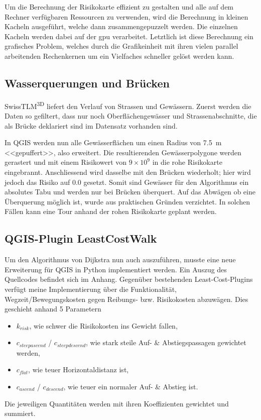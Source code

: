 Um die Berechnung der Risikokarte effizient zu gestalten und alle auf dem Rechner verfügbaren Ressourcen zu verwenden, wird die Berechnung in kleinen Kacheln ausgeführt, welche dann zusammengepuzzelt werden. Die einzelnen Kacheln werden dabei auf der \acrshort{gpu} verarbeitet. Letztlich ist diese Berechnung ein grafisches Problem, welches durch die Grafikeinheit mit ihren vielen parallel arbeitenden Rechenkernen um ein Vielfaches schneller gelöst werden kann.

\subsection{Wasserquerungen und Brücken}

SwissTLM\textsuperscript{3D} liefert den Verlauf von Strassen und Gewässern. Zuerst werden die Daten so gefiltert, dass nur noch Oberflächengewässer und Strassenabschnitte, die als Brücke deklariert sind im Datensatz vorhanden sind.

In QGIS werden nun alle Gewässerflächen um einen Radius von \qty{7.5}{m} <<gepuffert>>, also erweitert. Die resultierenden Gewässerpolygone werden gerastert und mit einem Risikowert von $9 \times 10^{9}$ in die rohe Risikokarte eingebrannt. Anschliessend wird dasselbe mit den Brücken wiederholt; hier wird jedoch das Risiko auf $0.0$ gesetzt. Somit sind Gewässer für den Algorithmus ein absolutes Tabu und werden nur bei Brücken überquert. Auf das Abwägen ob eine Überquerung möglich ist, wurde aus praktischen Gründen verzichtet. In solchen Fällen kann eine Tour anhand der rohen Risikokarte geplant werden.

\pagebreak
\subsection{QGIS-Plugin LeastCostWalk}

Um den Algorithmus von Dijkstra nun auch auszuführen, musste eine neue Erweiterung für QGIS in Python implementiert werden. Ein Auszug des Quellcodes befindet sich im Anhang. Gegenüber bestehenden Least-Cost-Plugins verfügt meine Implementierung über die Funktionalität, Wegzeit/Bewegungskosten gegen Reibungs- bzw. Risikokosten abzuwägen. Dies geschieht anhand 5 Parametern 

\begin{itemize}
  \item $k_{risk}$, wie schwer die Risikokosten ins Gewicht fallen,
  \item $c_{steepascend}$ / $c_{steepdescend}$, wie stark steile Auf- \& Abstiegspassagen gewichtet werden,
  \item $c_{flat}$, wie teuer Horizontaldistanz ist,
  \item $c_{ascend}$ / $c_{descend}$, wie teuer ein normaler Auf- \& Abstieg ist.
\end{itemize}
Die jeweiligen Quantitäten werden mit ihren Koeffizienten gewichtet und summiert.


